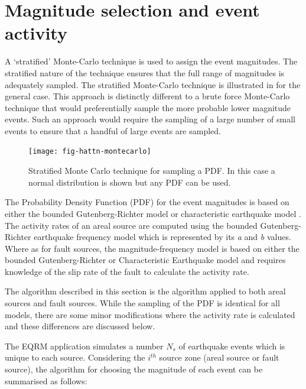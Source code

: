 \section{Magnitude selection and event activity}
\label{sec:magnitude_selection}

A `stratified' Monte-Carlo technique is used to assign the event
magnitudes. The stratified nature of the technique ensures that
the full range of magnitudes is adequately sampled. The stratified
Monte-Carlo technique is illustrated in
 for the general case. This approach is
distinctly different to a brute force Monte-Carlo technique that
would preferentially sample the more probable lower magnitude
events. Such an approach would require the sampling of a large
number of small events to ensure that a handful of large events
are sampled.


\begin{figure}[htp]
\texttt{[image: fig-hattn-montecarlo]}
\caption{Stratified Monte Carlo technique for sampling a PDF. In
this case a normal distribution is shown but any PDF can be used.}
\label{fig-hattn-montecarlo}
\end{figure}

The Probability Density Function (PDF) for the event magnitudes is
based on either the bounded Gutenberg-Richter model \citep{dr_Kramer96a} 
or characteristic earthquake model \citep{dr_schwartz84}. The activity rates of an areal source are computed using the
bounded Gutenberg-Richter earthquake frequency model which is represented by its \emph{a} and \emph{b} values. Where as 
for fault sources, the magnitude-frequency model is based on either the bounded Gutenberg-Richter or Characteristic Earthquake model and 
requires knowledge of the slip rate of the fault to calculate the activity rate. 

The algorithm described in this section is the algorithm applied
to both areal sources and fault sources. While the sampling of the PDF is identical for all models, there are some minor modifications 
where the activity rate is calculated and these differences are discussed below. 

The EQRM application simulates a number $N_s$ of earthquake
events which is unique to each source. Considering the $i^{th}$ source zone (areal source or fault source), the algorithm for
choosing the magnitude of each event can be summarised as follows:

